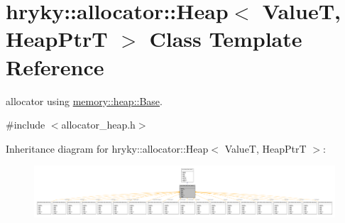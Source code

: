\hypertarget{classhryky_1_1allocator_1_1_heap}{\section{hryky\-:\-:allocator\-:\-:Heap$<$ Value\-T, Heap\-Ptr\-T $>$ Class Template Reference}
\label{classhryky_1_1allocator_1_1_heap}
}


allocator using \hyperlink{classhryky_1_1memory_1_1heap_1_1_base}{memory\-::heap\-::\-Base}.  




{\ttfamily \#include $<$allocator\-\_\-heap.\-h$>$}



Inheritance diagram for hryky\-:\-:allocator\-:\-:Heap$<$ Value\-T, Heap\-Ptr\-T $>$\-:
\nopagebreak
\begin{figure}[H]
\begin{center}
\leavevmode
\includegraphics[width=350pt]{classhryky_1_1allocator_1_1_heap__inherit__graph}
\end{center}
\end{figure}
